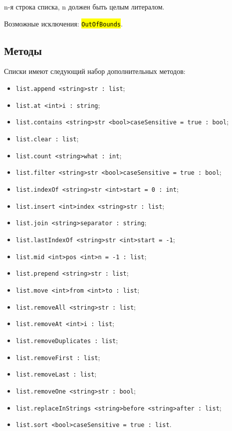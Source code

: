 \documentclass[a4paper, 14pt]{extarticle}
\newcommand{\ferror}[1]{\foreignlanguage{english}{\fontsize{11pt}{12pt}\tt{\sethlcolor{yellow}\hl{#1}}}}
\newenvironment{icItems}
	{ \begin{itemize} [noitemsep,nolistsep] }
	{ \end{itemize} }
\begin{document}
n-я строка списка, n должен быть целым литералом.

Возможные исключения: \ferror{OutOfBounds}.

\subsection{Методы}

Списки имеют следующий набор дополнительных методов:
\begin{icItems}
\item \lstinline|list.append <string>str : list|;
\item \lstinline|list.at <int>i : string|;
\item \lstinline|list.contains <string>str <bool>caseSensitive = true : bool|;
\item \lstinline|list.clear : list|;
\item \lstinline|list.count <string>what : int|;
\item \lstinline|list.filter <string>str <bool>caseSensitive = true : bool|;
\item \lstinline|list.indexOf <string>str <int>start = 0 : int|;
\item \lstinline|list.insert <int>index <string>str : list|;
\item \lstinline|list.join <string>separator : string|;
\item \lstinline|list.lastIndexOf <string>str <int>start = -1|;
\item \lstinline|list.mid <int>pos <int>n = -1 : list|;
\item \lstinline|list.prepend <string>str : list|;
\item \lstinline|list.move <int>from <int>to : list|;
\item \lstinline|list.removeAll <string>str : list|;
\item \lstinline|list.removeAt <int>i : list|;
\item \lstinline|list.removeDuplicates : list|;
\item \lstinline|list.removeFirst : list|;
\item \lstinline|list.removeLast : list|;
\item \lstinline|list.removeOne <string>str : bool|;
\item \lstinline|list.replaceInStrings <string>before <string>after : list|;
\item \lstinline|list.sort <bool>caseSensitive = true : list|.
\end{icItems}
\end{document}
